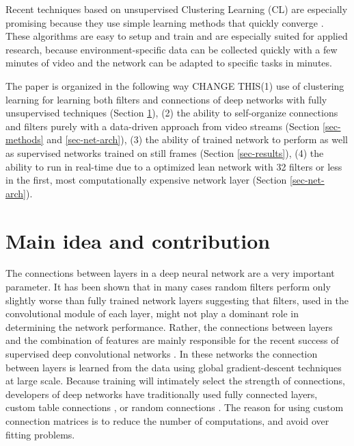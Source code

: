 \documentclass{article} %
\begin{document}
Recent techniques based on unsupervised Clustering Learning (CL) are especially promising because they use simple learning methods that quickly converge \cite{culurciello2013clustering,coates_analysis_2011}. 
These algorithms are easy to setup and train and are especially suited for applied research, because environment-specific data can be collected quickly with a few minutes of video and the network can be adapted to specific tasks in minutes.

The paper is organized in the following way CHANGE THIS(1) use of clustering learning for learning both filters and connections of deep networks with fully unsupervised techniques (Section \ref{sec-main}), (2) the ability to self-organize connections and filters purely with a data-driven approach from video streams (Section \ref{sec-methods} and  \ref{sec-net-arch}), (3) the ability of trained network to perform as well as supervised networks trained on still frames (Section \ref{sec-results}), (4) the ability to run in real-time due to a optimized lean network with 32 filters or less in the first, most computationally expensive network layer (Section \ref{sec-net-arch}). 



\section{Main idea and contribution}
\label{sec-main}

The connections between layers in a deep neural network are a very important parameter. It has been shown that in many cases random filters perform only slightly worse than fully trained network layers \cite{saxe2011random} suggesting that filters, used in the convolutional module of each layer, might not play a dominant role in determining the network performance.
Rather, the connections between layers and the combination of features are mainly responsible for the recent success of supervised deep convolutional networks \cite{krizhevsky_imagenet_2012}. In these networks the connection between layers is learned from the data using global gradient-descent techniques at large scale. Because training will intimately select the strength of connections, developers of deep networks have traditionally used fully connected layers, custom table connections \cite{lecun_gradient-based_1998}, or random connections \cite{lecun_convolutional_2010}. The reason for using custom connection matrices is to reduce the number of computations, and avoid over fitting problems.
 
\end{document}
